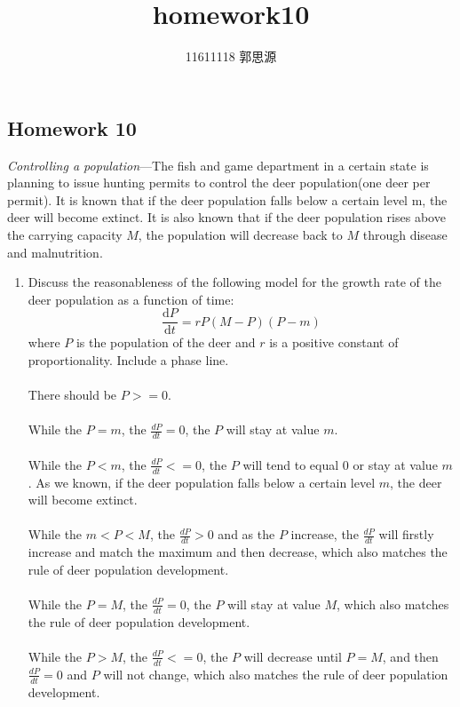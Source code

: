 \documentclass[12pt,a4paper]{article}
\newcommand{\dd}{\mathrm{d}}
\begin{document}
 
\title{homework10}
	\author{11611118 郭思源}  

\begin{spacing}{1.2}  
\section{Homework 10}
\textit{Controlling a population}---The fish and game department in a certain state is planning to issue hunting permits to control the deer population(one deer per permit). It is known that if the deer population falls below a certain level m, the deer will become extinct. It is also known that if the deer population rises above the carrying capacity $M$, the population will decrease back to $M$ through disease and malnutrition.
\begin{enumerate}[label={\textbf{\alph*.}}]
    \item Discuss the reasonableness of the following model for the growth rate of the deer population as a function of time:
    \[
        \frac{\dd P}{\dd t} = rP(M-P)(P-m)
    \]
    where $P$ is the population of the deer and $r$ is a positive constant of proportionality. Include a phase line.
    \\\\
    There should be $P >= 0$.  \\\\
    While the $P = m$, the $\frac{dP}{dt} = 0$, the $P$ will stay at value $m$.  \\\\
    While the $P < m$, the $\frac{dP}{dt} <= 0$, the $P$ will tend to equal 0 or stay at value $m$. As we known, if the deer population falls below a certain level $m$, the deer will become extinct. \\\\
    While the $m < P < M$, the $\frac{dP}{dt} > 0$ and as the $P$ increase, the $\frac{dP}{dt}$ will firstly increase and match the maximum and then decrease, which also matches the rule of deer population development. \\\\
    While the $P = M$, the $\frac{dP}{dt} = 0$, the $P$ will stay at value $M$, which also matches the rule of deer population development.  \\\\
    While the $P > M$, the $\frac{dP}{dt} <= 0$, the $P$ will decrease until $P=M$, and then $\frac{dP}{dt} = 0$ and $P$ will not change, which also matches the rule of deer population development. 
    \newpage


\end{enumerate}
\end{spacing}
\end{document}
